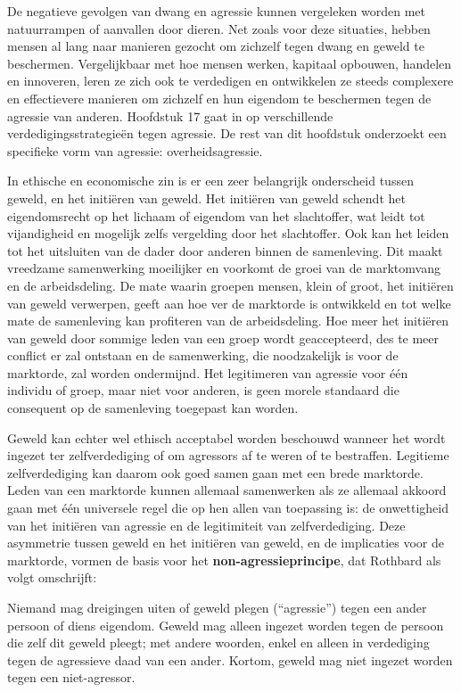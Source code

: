 De negatieve gevolgen van dwang en agressie kunnen vergeleken worden met natuurrampen of aanvallen door dieren. Net zoals voor deze situaties, hebben mensen al lang naar manieren gezocht om zichzelf tegen dwang en geweld te beschermen. Vergelijkbaar met hoe mensen werken, kapitaal opbouwen, handelen en innoveren, leren ze zich ook te verdedigen en ontwikkelen ze steeds complexere en effectievere manieren om zichzelf en hun eigendom te beschermen tegen de agressie van anderen. Hoofdstuk 17 gaat in op verschillende verdedigingsstrategieën tegen agressie. De rest van dit hoofdstuk onderzoekt een specifieke vorm van agressie: overheidsagressie.

In ethische en economische zin is er een zeer belangrijk onderscheid tussen geweld, en het initiëren van geweld. Het initiëren van geweld schendt het eigendomsrecht op het lichaam of eigendom van het slachtoffer, wat leidt tot vijandigheid en mogelijk zelfs vergelding door het slachtoffer. Ook kan het leiden tot het uitsluiten van de dader door anderen binnen de samenleving. Dit maakt vreedzame samenwerking moeilijker en voorkomt de groei van de marktomvang en de arbeidsdeling. De mate waarin groepen mensen, klein of groot, het initiëren van geweld verwerpen, geeft aan hoe ver de marktorde is ontwikkeld en tot welke mate de samenleving kan profiteren van de arbeidsdeling. Hoe meer het initiëren van geweld door sommige leden van een groep wordt geaccepteerd, des te meer conflict er zal ontstaan en de samenwerking, die noodzakelijk is voor de marktorde, zal worden ondermijnd. Het legitimeren van agressie voor één individu of groep, maar niet voor anderen, is geen morele standaard die consequent op de samenleving toegepast kan worden.

Geweld kan echter wel ethisch acceptabel worden beschouwd wanneer het wordt ingezet ter zelfverdediging of om agressors af te weren of te bestraffen. Legitieme zelfverdediging kan daarom ook goed samen gaan met een brede marktorde. Leden van een marktorde kunnen allemaal samenwerken als ze allemaal akkoord gaan met één universele regel die op hen allen van toepassing is: de onwettigheid van het initiëren van agressie en de legitimiteit van zelfverdediging. Deze asymmetrie tussen geweld en het initiëren van geweld, en de implicaties voor de marktorde, vormen de basis voor het \textbf{non-agressieprincipe}, dat Rothbard als volgt omschrijft:

\begin{blockquotebox}
Niemand mag dreigingen uiten of geweld plegen (``agressie'') tegen een ander persoon of diens eigendom. Geweld mag alleen ingezet worden tegen de persoon die zelf dit geweld pleegt; met andere woorden, enkel en alleen in verdediging tegen de agressieve daad van een ander. Kortom, geweld mag niet ingezet worden tegen een niet-agressor.\footnotemark
\end{blockquotebox}
\autocite{179}

